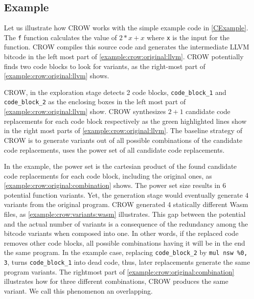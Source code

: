 
\subsection{Example}
\label{section:crow:example}
 Let us illustrate how CROW works with the simple example code in \autoref{CExample}. The \texttt{f} function calculates the value of $2 * x + x$ where \texttt{x} is the input for the function. CROW compiles this source code and generates the intermediate LLVM bitcode in the left most part of \autoref{example:crow:original:llvm}. CROW potentially finds two code blocks to look for variants, as the right-most part of \autoref{example:crow:original:llvm} shows.


    

CROW, in the exploration stage detects 2 code blocks, \texttt{code\_block\_1} and \texttt{code\_block\_2} as the enclosing boxes in the left most part of \autoref{example:crow:original:llvm} show. CROW synthesizes $2 + 1$ candidate code replacements for each code block respectively as the green highlighted lines show in the right most parts of \autoref{example:crow:original:llvm}.
The baseline strategy of CROW is to generate variants out of all possible combinations of the candidate code replacements, \ie uses the power set of all candidate code replacements.

In the example, the power set is the cartesian product of the found candidate code replacements for each code block, including the original ones, as \autoref{example:crow:original:combination} shows. The power set size results in $6$ potential function variants. Yet, the generation stage would eventually generate $4$ variants from the original program. CROW generated 4 statically different Wasm files, as \autoref{example:crow:variants:wasm} illustrates. This gap between the potential and the actual number of variants is a consequence of the redundancy among the bitcode variants when composed into one. In other words, if the replaced code removes other code blocks, all possible combinations having it will be in the end the same program. In the example case, replacing \texttt{code\_block\_2} by \texttt{mul nsw \%0, 3}, turns \texttt{code\_block\_1} into dead code, thus, later replacements generate the same program variants. The rightmost part of \autoref{example:crow:original:combination} illustrates how for three different combinations, CROW produces the same variant. We call this phenomenon an overlapping.

